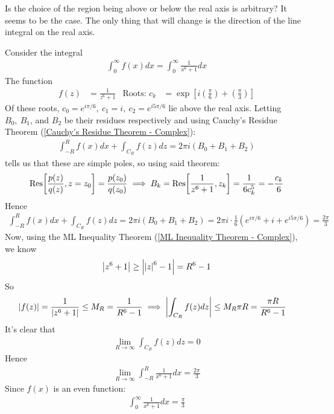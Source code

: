\documentclass[12pt, english]{book}
\begin{document}
	\begin{question}
		Is the choice of the region being above or below the real axis is arbitrary? It seems to be the case. The only thing that will change is the direction of the line integral on the real axis.
	\end{question}

	\begin{example}
		Consider the integral 
		\begin{align*}
			\int_{0}^{\infty} f(x) dx 
			= \int_{0}^{\infty} \frac{1}{x^6 + 1} dx
		\end{align*}
		The function 
		\begin{align*}
			f(z) &= \frac{1}{z^6 + 1} 
				& \text{Roots: } c_k &= \exp[i\left(\frac{\pi}{6}\right) + \left(\frac{\pi}{3}\right)]
		\end{align*}
		Of these roots, \(c_0 = e^{i\pi/6}, \ c_1 = i, \ c_2 = e^{i5\pi/6}\) lie above the real axis. Letting \(B_0, \ B_1\), and \(B_2\) be their residues respectively and using Cauchy's Residue Theorem (\cref{Cauchy's Residue Theorem - Complex}):
		\begin{align*}
			\int_{-R}^{R} f(x) dx + \int_{C_R} f(z) dz = 2\pi i(B_0 + B_1 + B_2)
		\end{align*}
		 tells us that these are simple poles, so using said theorem:
		\begin{align*}
			\Res[\frac{p(z)}{q(z)}, z=z_0] = \frac{p(z_0)}{q(z_0)}
			\implies B_k = \Res[\frac{1}{z^6 + 1}, z_k] = \frac{1}{6 c_k^5} = -\frac{c_k}{6}
		\end{align*}
		Hence
		\begin{align*}
			\int_{-R}^{R} f(x) dx + \int_{C_R} f(z) dz 
			= 2\pi i(B_0 + B_1 + B_2)
			= 2\pi i \cdot \frac{1}{6} (e^{i\pi/6} + i + e^{i5\pi/6})
			= \frac{2\pi}{3}
		\end{align*}
		Now, using the ML Inequality Theorem (\cref{ML Inequality Theorem - Complex}), we know
		\begin{align*}
			\abs{z^6 + 1} \geq \abs{\abs{z}^6 - 1} = R^6 - 1
		\end{align*}
		So
		\begin{align*}
			\abs{f(z)} = \frac{1}{\abs{z^6 + 1}} \leq M_R = \frac{1}{R^6 - 1} 
			&\implies \abs{\int_{C_R} f(z) dz} \leq M_R \pi R = \frac{\pi R}{R^6 - 1}
		\end{align*}
		It's clear that 
		\begin{align*}
			\lim_{R \rightarrow \infty} \int_{C_R} f(z) dz = 0
		\end{align*}
		Hence
		\begin{align*}
			\lim_{R \rightarrow \infty} \int_{-R}^{R} \frac{1}{x^6 + 1} dx = \frac{2\pi}{3}
		\end{align*}
		Since \(f(x)\) is an even function:
		\begin{align*}
			\int_{0}^{\infty} \frac{1}{x^6 + 1} dx = \frac{\pi}{3}
		\end{align*}
	\end{example}
\end{document}
